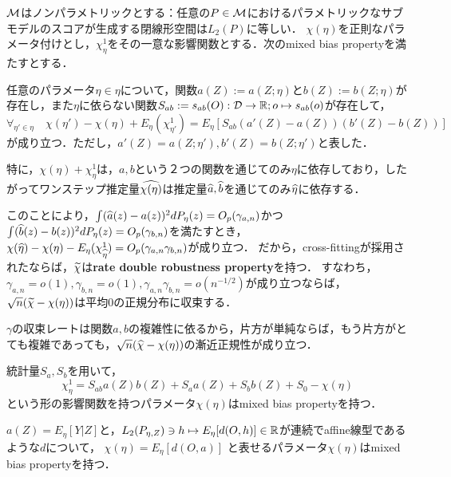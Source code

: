 \documentclass[uplatex,dvipdfmx]{jsreport}
\begin{document}
\begin{notation}
    $\mathcal{M}$はノンパラメトリックとする：任意の$P\in\mathcal{M}$におけるパラメトリックなサブモデルのスコアが生成する閉線形空間は$L_2(P)$に等しい．
    $\chi(\eta)$を正則なパラメータ付けとし，$\chi^1_\eta$をその一意な影響関数とする．次のmixed bias propertyを満たすとする．
\end{notation}

\begin{definition}
    任意のパラメータ$\eta\in\eta$について，関数$a(Z):=a(Z;\eta)$と$b(Z):=b(Z;\eta)$が存在し，また$\eta$に依らない関数$S_{ab}:=s_{ab}(O):\mathcal{D}\to\mathbb{R};o\mapsto s_{ab}(o)$が存在して，
    \[\forall_{\eta'\in\eta}\quad\chi(\eta')-\chi(\eta)+E_\eta(\chi^1_{\eta'})=E_\eta[S_{ab}(a'(Z)-a(Z))(b'(Z)-b(Z))]\]
    が成り立つ．ただし，$a'(Z)=a(Z;\eta'),b'(Z)=b(Z;\eta')$と表した．
\end{definition}
\begin{remarks}
    特に，$\chi(\eta)+\chi^1_\eta$は，$a,b$という２つの関数を通じてのみ$\eta$に依存しており，したがってワンステップ推定量$\widehat{\chi(\eta)}$は推定量$\widehat{a},\widehat{b}$を通じてのみ$\widehat{\eta}$に依存する．

    このことにより，$\int(\widehat{a}(z)-a(z))^2dP_\eta(z)=O_p(\gamma_{a,n})$かつ$\int(\widehat{b}(z)-b(z))^2dP_\eta(z)=O_p(\gamma_{b,n})$を満たすとき，
    $\chi(\widehat{\eta})-\chi(\eta)-E_\eta(\chi^1_{\widehat{\eta}})=O_p(\gamma_{a,n}\gamma_{b,n})$が成り立つ．
    だから，cross-fittingが採用されたならば，$\widetilde{\chi}$は\textbf{rate double robustness property}を持つ．
    すなわち，$\gamma_{a,n}=o(1),\gamma_{b,n}=o(1),\gamma_{a,n}\gamma_{b,n}=o(n^{-1/2})$が成り立つならば，$\sqrt{n}(\widetilde{\chi}-\chi(\eta))$は平均$0$の正規分布に収束する．

    $\gamma$の収束レートは関数$a,b$の複雑性に依るから，片方が単純ならば，もう片方がとても複雑であっても，$\sqrt{n}(\widehat{\chi}-\chi(\eta))$の漸近正規性が成り立つ．
\end{remarks}

\begin{example}[Rubin 2008]
    統計量$S_a,S_b$を用いて，
    \[\chi^1_\eta=S_{ab}a(Z)b(Z)+S_aa(Z)+S_bb(Z)+S_0-\chi(\eta)\]
    という形の影響関数を持つパラメータ$\chi(\eta)$はmixed bias propertyを持つ．
\end{example}

\begin{example}[Chernozhukov 2018]
    $a(Z)=E_\eta[Y|Z]$と，$L_2(P_{\eta,Z})\ni h\mapsto E_\eta[d(O,h)]\in\mathbb{R}$が連続でaffine線型であるような$d$について，
    $\chi(\eta)=E_\eta[d(O,a)]$
    と表せるパラメータ$\chi(\eta)$はmixed bias propertyを持つ．
\end{example}
\end{document}
